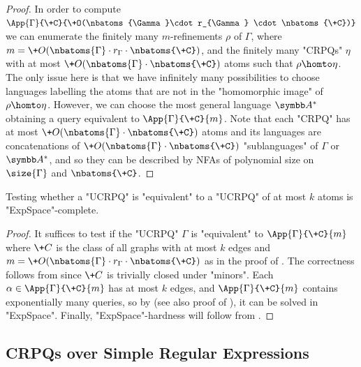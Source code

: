 \begin{proof}
	In order to compute $\App{\Gamma}{\+C}{\+O(\nbatoms{\Gamma}\cdot r_{\Gamma} \cdot \nbatoms{\+C})}$ we can enumerate the finitely many $m$-refinements $\rho$ of $\Gamma$, where $m=\+O(\nbatoms{\Gamma}\cdot r_{\Gamma} \cdot \nbatoms{\+C})$, and the finitely many "CRPQs"  $\eta$ with at most $\+O(\nbatoms{\Gamma} \cdot \nbatoms{\+C})$ atoms such that $\rho\homto \eta$. The only issue here is that we have infinitely many possibilities to choose languages labelling the atoms that are not in the "homomorphic image" of $\rho \homto \eta$. However, we can  choose the most general language $\A^*$ obtaining a query equivalent to $\App{\Gamma}{\+C}{m}$. 
	Note that each "CRPQ" has at most $\+O(\nbatoms{\Gamma} \cdot \nbatoms{\+C})$ atoms and its languages are concatenations of
	 $\+O(\nbatoms{\Gamma} \cdot \nbatoms{\+C})$ "sublanguages" of $\Gamma$ or $\A^*$, and
	so they can be described by NFAs of polynomial size on $\size{\Gamma}$ and $\nbatoms{\+C}$.
\end{proof}

\begin{corollary}
	\AP\label{coro:upperbound-ucrpqs}
	Testing whether a "UCRPQ" is "equivalent" to a "UCRPQ" of at most $k$ atoms is "ExpSpace"-complete.
\end{corollary}

\begin{proof}
	It suffices to test if the "UCRPQ" $\Gamma$ is "equivalent"
	to $\App{\Gamma}{\+C}{m}$ where $\+C$ is the class of all graphs
	with at most $k$ edges and $m=\+O(\nbatoms{\Gamma}\cdot r_{\Gamma} \cdot \nbatoms{\+C})$ as in the proof of . 
	The correctness follows from  since $\+C$ is
	trivially closed under "minors".
	Each $\alpha \in \App{\Gamma}{\+C}{m}$ has at most $k$ edges,
	and $\App{\Gamma}{\+C}{m}$ contains exponentially many queries,
	so by \cite[Proposition 3.11]{FigueiraMorvan2025SemanticTreeWidthLMCS} (see also proof of ), it can be solved
	in "ExpSpace".
	Finally, "ExpSpace"-hardness will follow from .
\end{proof}

\subsection{CRPQs over Simple Regular Expressions}

